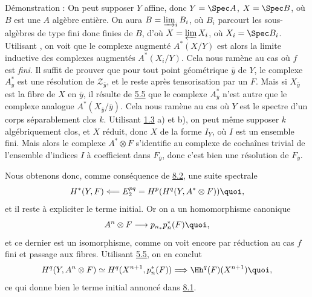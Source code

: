 \documentclass[10pt]{../fichiers-configuration-latex/smfart}
\begin{document}
\noindent
Démonstration : On peut supposer $Y$ affine, donc $Y = \Spec A$, $X
= \Spec B$, où $B$ est une $A$ algèbre entière. On aura $B =
\varinjlim_i B_i$, où $B_i$ parcourt les sous-algèbres de type fini
donc finies de $B$, d'où $X=\varprojlim X_{i}$, où $X_{i}=\Spec
B_{i}$. Utilisant , on voit que le complexe
augmenté $A^{\ast}(X/Y)$ est alors la limite inductive des complexes
augmentés $A^{\ast}(X_{i}/Y)$. Cela nous ramène au cas où $f$ est
\emph{fini}. Il suffit de prouver que pour tout point géométrique
$\bar{y}$ de $Y$, le complexe $A^{\ast}_{y}$ est une résolution de
$𝒵_{\bar{y}}$, et le reste après tensorisation par un $F$.
Mais si $X_{\bar{y}}$ est la fibre de $X$ en $\bar{y}$, il résulte
de \hyperref[VIII.prop5.5]{5.5} que le complexe $A^{\ast}_{\bar{y}}$ n'est
autre que le complexe analogue $A^{\ast}(X_{\bar{y}}/\bar{y})$. Cela
nous ramène au cas où $Y$ est le spectre d'un corps séparablement
clos $k$. Utilisant \hyperref[VIII.exem1.3]{1.3} a) et b), on peut même
supposer $k$ algébriquement clos, et $X$ réduit, donc $X$ de la
forme $I_{Y}$, où $I$ est un ensemble fini. Mais alors le complexe
$A^{\ast}\otimes F$ s'identifie au complexe de cochaînes trivial de
l'ensemble d'indices $I$ à coefficient dans $F_{\bar{y}}$, donc
c'est bien une résolution de $F_{\bar{y}}$.

Nous obtenons donc, comme conséquence de \hyperref[VIII.lem8.2]{8.2}, une suite spectrale
$$
H^{\ast}(Y,F)\Longleftarrow E^{pq}_{2}=H^{p}(H^{q}(Y,A^{\ast}\otimes
F)){\quoi},
$$
et il reste à expliciter le terme initial. Or on a un homomorphisme
canonique\pageoriginale
$$
A^{n}\otimes F\longrightarrow p_{n_{\ast}}p^{\ast}_{n}(F){\quoi},
$$
et ce dernier est un isomorphisme, comme on voit encore par réduction
au cas $f$ fini et passage aux fibres. Utilisant \hyperref[VIII.prop5.5]{5.5}, on en conclut
$$
H^{q}(Y,A^{n}\otimes F)\simeq
H^{q}(X^{n+1},p^{\ast}_{n}(F))\Longrightarrow
\Hh^{q}(F)(X^{n+1}){\quoi},
$$
ce qui donne bien le terme initial annoncé dans \hyperref[VIII.prop8.1]{8.1}.
\end{document}

